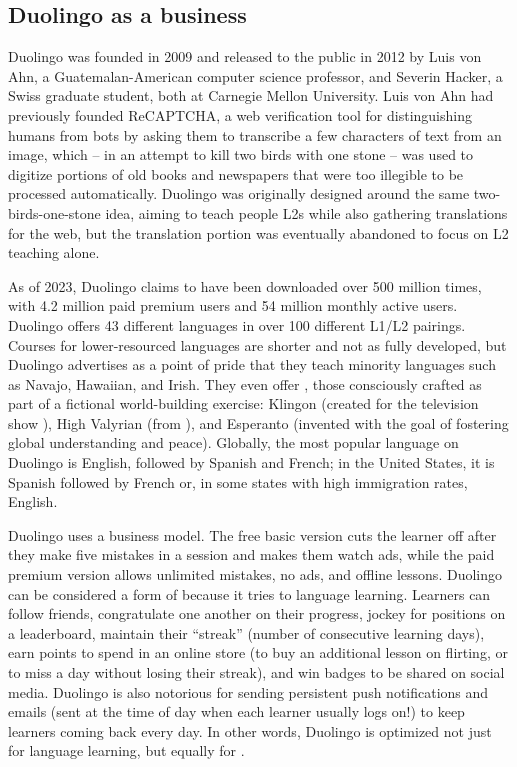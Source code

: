 \subsection{Duolingo as a business}

Duolingo was founded in 2009 and released to the public in 2012 by Luis von Ahn, a Guatemalan-American computer science professor, and Severin Hacker, a Swiss graduate student, both at Carnegie Mellon University.  Luis von Ahn had previously founded ReCAPTCHA, a web verification tool for distinguishing humans from bots by asking them to transcribe a few characters of text from an image, which -- in an attempt to kill two birds with one stone -- was used to digitize portions of old books and newspapers that were too illegible to be processed automatically.  Duolingo was originally designed around the same two-birds-one-stone idea, aiming to teach people L2s while also gathering translations for the web, but the translation portion was eventually abandoned to focus on L2 teaching alone.

As of 2023, Duolingo claims to have been downloaded over 500 million times, with 4.2 million paid premium users and 54 million monthly active users.   Duolingo offers 43 different languages in over 100 different L1/L2 pairings.  Courses for lower-resourced languages are shorter and not as fully developed, but Duolingo advertises as a point of pride that they teach minority languages such as Navajo, Hawaiian, and Irish.  They even offer , those consciously crafted as part of a fictional world-building exercise: Klingon (created for the television show ), High Valyrian (from ), and Esperanto (invented with the goal of fostering global understanding and peace).  Globally, the most popular language on Duolingo is English, followed by Spanish and French; in the United States, it is Spanish followed by French or, in some states with high immigration rates, English.  

Duolingo uses a  business model.  The free basic version cuts the learner off after they make five mistakes in a session and makes them watch ads, while the paid premium version allows unlimited mistakes, no ads, and offline lessons.  Duolingo can be considered a form of  because it tries to  language learning.  Learners can follow friends, congratulate one another on their progress,  jockey for positions on a leaderboard, maintain their ``streak'' (number of consecutive learning days), earn points to spend in an online store (to buy an additional lesson on flirting, or to miss a day without losing their streak), and win badges to be shared on social media.  Duolingo is also notorious for sending persistent push notifications and emails (sent at the time of day when each learner usually logs on!) to keep learners coming back every day.  In other words, Duolingo is optimized not just for language learning, but equally for .


